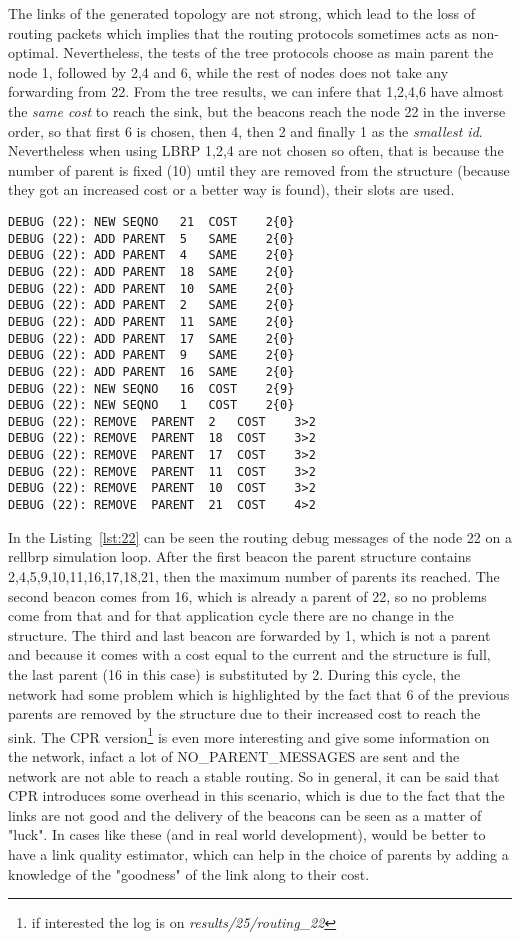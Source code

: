 \documentclass{article}
\begin{document}
The links of the generated topology are not strong, which lead to the loss of routing packets which implies that the routing protocols sometimes acts as non-optimal. Nevertheless, the tests of the tree protocols choose as main parent the node 1, followed by 2,4 and 6, while the rest of nodes does not take any forwarding from 22. From the tree results, we can infere that 1,2,4,6 have almost the \textit{same cost} to reach the sink, but the beacons reach the node 22 in the inverse order, so that first 6 is chosen, then 4, then 2 and finally 1 as the \textit{smallest id}. Nevertheless when using LBRP 1,2,4 are not chosen so often, that is because the number of parent is fixed (10) until they are removed from the structure (because they got an increased cost or a better way is found), their slots are used.
\begin{lstlisting}[caption=Routing debug messages of node 22 with rellbrp,label=lst:22]
DEBUG (22): NEW	SEQNO	21	COST	2{0}
DEBUG (22): ADD	PARENT	5	SAME	2{0}
DEBUG (22): ADD	PARENT	4	SAME	2{0}
DEBUG (22): ADD	PARENT	18	SAME	2{0}
DEBUG (22): ADD	PARENT	10	SAME	2{0}
DEBUG (22): ADD	PARENT	2	SAME	2{0}
DEBUG (22): ADD	PARENT	11	SAME	2{0}
DEBUG (22): ADD	PARENT	17	SAME	2{0}
DEBUG (22): ADD	PARENT	9	SAME	2{0}
DEBUG (22): ADD	PARENT	16	SAME	2{0}
DEBUG (22): NEW	SEQNO	16	COST	2{9}
DEBUG (22): NEW	SEQNO	1	COST	2{0}
DEBUG (22): REMOVE	PARENT	2	COST	3>2
DEBUG (22): REMOVE	PARENT	18	COST	3>2
DEBUG (22): REMOVE	PARENT	17	COST	3>2
DEBUG (22): REMOVE	PARENT	11	COST	3>2
DEBUG (22): REMOVE	PARENT	10	COST	3>2
DEBUG (22): REMOVE	PARENT	21	COST	4>2
\end{lstlisting}
In the Listing~\ref{lst:22} can be seen the routing debug messages of the node 22 on a rellbrp simulation loop. After the first beacon the parent structure contains {2,4,5,9,10,11,16,17,18,21}, then the maximum number of parents its reached. The second beacon comes from 16, which is already a parent of 22, so no problems come from that and for that application cycle there are no change in the structure. The third and last beacon are forwarded by 1, which is not a parent and because it comes with a cost equal to the current and the structure is full, the last parent (16 in this case) is substituted by 2. During this cycle, the network had some problem which is highlighted by the fact that 6 of the previous parents are removed by the structure due to their increased cost to reach the sink. The CPR version\footnote{if interested the log is on \textit{results/25/routing\_22}} is even more interesting and give some information on the network, infact a lot of NO\_PARENT\_MESSAGES are sent and the network are not able to reach a stable routing. So in general, it can be said that CPR introduces some overhead in this scenario, which is due to the fact that the links are not good and the delivery of the beacons can be seen as a matter of "luck". In cases like these (and in real world development), would be better to have a link quality estimator, which can help in the choice of parents by adding a knowledge of the "goodness" of the link along to their cost.
\end{document}
